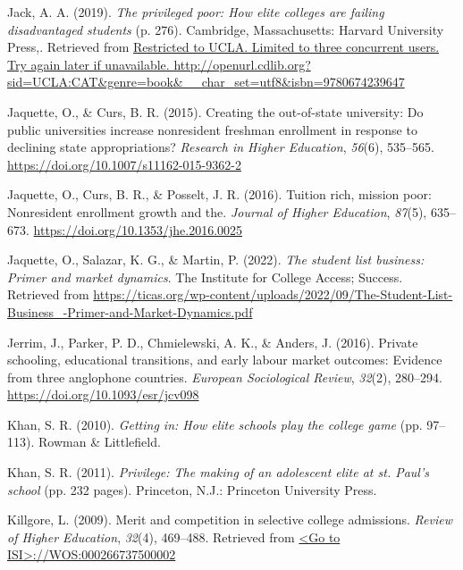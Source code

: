 \documentclass[
  12pt,
]{article}
\newlength{\cslhangindent}
\newenvironment{CSLReferences}[2] %
 {\begin{list}{}{%
  \setlength{\itemindent}{0pt}
  \setlength{\leftmargin}{0pt}
  \setlength{\parsep}{0pt}
  \ifodd #1
   \setlength{\leftmargin}{\cslhangindent}
   \setlength{\itemindent}{-1\cslhangindent}
  \fi
  \setlength{\itemsep}{#2\baselineskip}}}
 {\end{list}}
\begin{document}
\begin{CSLReferences}{1}{0}
Jack, A. A. (2019). \emph{The privileged poor: How elite colleges are failing disadvantaged students} (p. 276). Cambridge, Massachusetts: Harvard University Press,. Retrieved from \href{Restricted\%20to\%20UCLA.\%20Limited\%20to\%20three\%20concurrent\%20users.\%20Try\%20again\%20later\%20if\%20unavailable.\%20http://openurl.cdlib.org?sid=UCLA:CAT&genre=book&__char_set=utf8&isbn=9780674239647}{Restricted to UCLA. Limited to three concurrent users. Try again later if unavailable. http://openurl.cdlib.org?sid=UCLA:CAT\&genre=book\&\_\_char\_set=utf8\&isbn=9780674239647}

Jaquette, O., \& Curs, B. R. (2015). Creating the out-of-state university: Do public universities increase nonresident freshman enrollment in response to declining state appropriations? \emph{Research in Higher Education}, \emph{56}(6), 535--565. \url{https://doi.org/10.1007/s11162-015-9362-2}

Jaquette, O., Curs, B. R., \& Posselt, J. R. (2016). Tuition rich, mission poor: Nonresident enrollment growth and the. \emph{Journal of Higher Education}, \emph{87}(5), 635--673. \url{https://doi.org/10.1353/jhe.2016.0025}

Jaquette, O., Salazar, K. G., \& Martin, P. (2022). \emph{The student list business: Primer and market dynamics}. The Institute for College Access; Success. Retrieved from \url{https://ticas.org/wp-content/uploads/2022/09/The-Student-List-Business_-Primer-and-Market-Dynamics.pdf}

Jerrim, J., Parker, P. D., Chmielewski, A. K., \& Anders, J. (2016). Private schooling, educational transitions, and early labour market outcomes: Evidence from three anglophone countries. \emph{European Sociological Review}, \emph{32}(2), 280--294. \url{https://doi.org/10.1093/esr/jcv098}

Khan, S. R. (2010). \emph{Getting in: How elite schools play the college game} (pp. 97--113). Rowman \& Littlefield.

Khan, S. R. (2011). \emph{Privilege: The making of an adolescent elite at st. Paul's school} (pp. 232 pages). Princeton, N.J.: Princeton University Press.

Killgore, L. (2009). Merit and competition in selective college admissions. \emph{Review of Higher Education}, \emph{32}(4), 469--488. Retrieved from \href{\%3CGo\%20to\%20ISI\%3E://WOS:000266737500002}{\textless Go to ISI\textgreater://WOS:000266737500002}


\end{CSLReferences}
\end{document}
